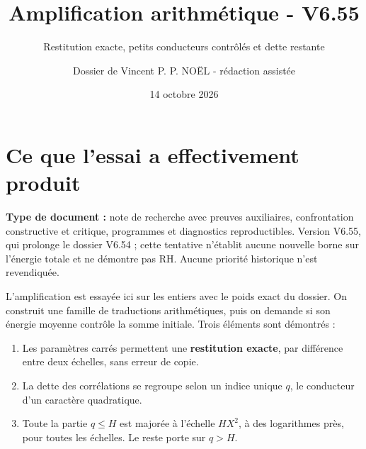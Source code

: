 \documentclass[
  11pt,
  a4paper,
]{article}
\title{Amplification arithmétique - V6.55}
\subtitle{Restitution exacte, petits conducteurs contrôlés et dette
restante}
\author{Dossier de Vincent P. P. NOËL - rédaction assistée}
\date{14 octobre 2026}
\providecommand{\tightlist}{%
  \setlength{\itemsep}{0pt}\setlength{\parskip}{0pt}}
\begin{document}
\maketitle

\hypertarget{ce-que-lessai-a-effectivement-produit}{%
\section{Ce que l'essai a effectivement
produit}\label{ce-que-lessai-a-effectivement-produit}}

\textbf{Type de document :} note de recherche avec preuves auxiliaires,
confrontation constructive et critique, programmes et diagnostics
reproductibles. Version V6.55, qui prolonge le dossier V6.54 ; cette
tentative n'établit aucune nouvelle borne sur l'énergie totale et ne
démontre pas RH. Aucune priorité historique n'est revendiquée.

L'amplification est essayée ici sur les entiers avec le poids exact du
dossier. On construit une famille de traductions arithmétiques, puis on
demande si son énergie moyenne contrôle la somme initiale. Trois
éléments sont démontrés :

\begin{enumerate}
\def\labelenumi{\arabic{enumi}.}
\tightlist
\item
  Les paramètres carrés permettent une \textbf{restitution exacte}, par
  différence entre deux échelles, sans erreur de copie.
\item
  La dette des corrélations se regroupe selon un indice unique \(q\), le
  conducteur d'un caractère quadratique.
\item
  Toute la partie \(q\le H\) est majorée à l'échelle \(HX^2\), à des
  logarithmes près, pour toutes les échelles. Le reste porte sur
  \(q>H\).
\end{enumerate}
\end{document}
